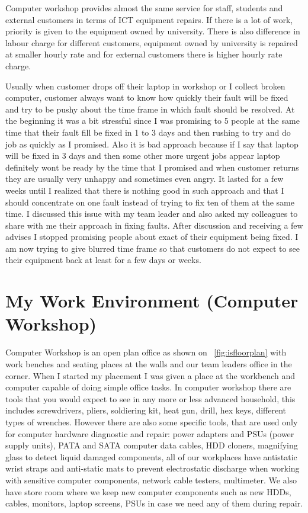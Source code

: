 \documentclass[10pt,a4paper,headinclude=true]{report}
\begin{document}
Computer workshop provides almost the same service for staff, students and external customers in terms of ICT equipment repairs. If there is a lot of work, priority is given to the equipment owned by university. There is also difference in labour charge for different customers, equipment owned by university is repaired at smaller hourly rate and for external customers there is higher hourly rate charge.

Usually when customer drops off their laptop in workshop or I collect broken computer, customer always want to know how quickly their fault will be fixed and try to be pushy about the time frame in which fault should be resolved. At the beginning it was a bit stressful since I was promising to 5 people at the same time that their fault fill be fixed in 1 to 3 days and then rushing to try and do job as quickly as I promised. Also it is bad approach because if I say that laptop will be fixed in 3 days and then some other more urgent jobs appear laptop definitely wont be ready by the time that I promised and when customer returns they are usually very unhappy and sometimes even angry. It lasted for a few weeks until I realized that there is nothing good in such approach and that I should concentrate on one fault instead of trying to fix ten of them at the same time. I discussed this issue with my team leader and also asked my colleagues to share with me their approach in fixing faults. After discussion and receiving a few advises I stopped promising people about exact of their equipment being fixed. I am now trying to give blurred time frame so that customers do not expect to see their equipment back at least for a few days or weeks.  
\section{My Work Environment (Computer Workshop)}
Computer Workshop is an open plan office as shown on ~\ref{fig:isfloorplan} with work benches and seating places at the walls and our team leaders office in the corner. When I started my placement I was given a place at the workbench and computer capable of doing simple office tasks. In computer workshop there are tools that you would expect to see in any more or less advanced household, this includes screwdrivers, pliers, soldiering kit, heat gun, drill, hex keys, different types of wrenches. However there are also some specific tools, that are used only for computer hardware diagnostic and repair: power adapters and PSUs (power supply units), PATA and SATA computer data cables, HDD cloners, magnifying glass to detect liquid damaged components, all of our workplaces have antistatic wrist straps and anti-static mats to prevent electrostatic discharge when working with sensitive computer components, network cable testers, multimeter. We also have store room where we keep new computer components such as new HDDs, cables, monitors, laptop screens, PSUs in case we need any of them during repair.    
\end{document}
